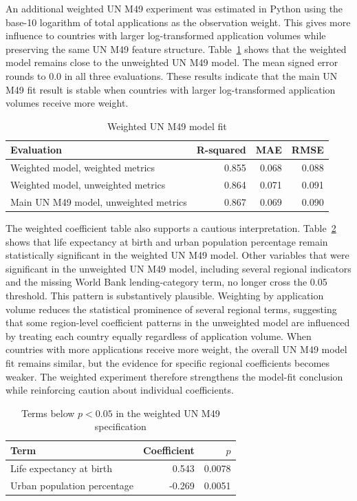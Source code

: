 \documentclass[runningheads]{llncs}
\begin{document}
An additional weighted UN M49 experiment was estimated in Python using the base-10 logarithm of total applications as the observation weight. This gives more influence to countries with larger log-transformed application volumes while preserving the same UN M49 feature structure. Table~\ref{tab:weighted-un-m49-fit} shows that the weighted model remains close to the unweighted UN M49 model. The mean signed error rounds to 0.0 in all three evaluations. These results indicate that the main UN M49 fit result is stable when countries with larger log-transformed application volumes receive more weight.

\begin{table}
\caption{Weighted UN M49 model fit}
\label{tab:weighted-un-m49-fit}
\centering
\renewcommand{\arraystretch}{1.2}
\setlength{\tabcolsep}{6pt}
\begin{tabular}{lrrr}
\hline
Evaluation & R-squared & MAE & RMSE \\
\hline
Weighted model, weighted metrics & 0.855 & 0.068 & 0.088 \\
Weighted model, unweighted metrics & 0.864 & 0.071 & 0.091 \\
Main UN M49 model, unweighted metrics & 0.867 & 0.069 & 0.090 \\
\hline
\end{tabular}
\end{table}

The weighted coefficient table also supports a cautious interpretation. Table~\ref{tab:weighted-un-m49-significant-terms} shows that life expectancy at birth and urban population percentage remain statistically significant in the weighted UN M49 model. Other variables that were significant in the unweighted UN M49 model, including several regional indicators and the missing World Bank lending-category term, no longer cross the 0.05 threshold. This pattern is substantively plausible. Weighting by application volume reduces the statistical prominence of several regional terms, suggesting that some region-level coefficient patterns in the unweighted model are influenced by treating each country equally regardless of application volume. When countries with more applications receive more weight, the overall UN M49 model fit remains similar, but the evidence for specific regional coefficients becomes weaker. The weighted experiment therefore strengthens the model-fit conclusion while reinforcing caution about individual coefficients.

\begin{table}
\caption{Terms below $p < 0.05$ in the weighted UN M49 specification}
\label{tab:weighted-un-m49-significant-terms}
\centering
\renewcommand{\arraystretch}{1.2}
\setlength{\tabcolsep}{7pt}
\begin{tabular}{lrr}
\hline
Term & Coefficient & $p$ \\
\hline
Life expectancy at birth & 0.543 & 0.0078 \\
Urban population percentage & -0.269 & 0.0051 \\
\hline
\end{tabular}
\end{table}
\end{document}
